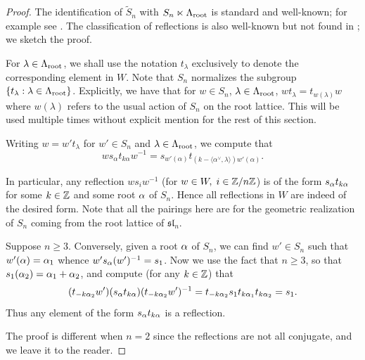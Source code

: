 \begin{proof}[Proof] 
The identification of $\tilde{S}_n$ with $S_n\ltimes\Lambda_{\operatorname{root}}$ is standard and well-known; for example see  \cite[Chapter 4]{HumphreysCoxeter}. The classification of reflections is also well-known but not found in \cite{HumphreysCoxeter}; we sketch the proof.

For $\lambda \in \Lambda_{\operatorname{root}}$, we shall use the notation $t_{\lambda}$ exclusively  to denote the corresponding element in $W$. Note that $S_n$ normalizes the subgroup $\{t_{\lambda}: \lambda \in \Lambda_{\operatorname{root}}\}$. 
Explicitly, we have that for $w\in S_n$, $\lambda \in \Lambda_{\operatorname{root}}$, $wt_{\lambda}=t_{w(\lambda)}w$ where $w(\lambda)$ refers to the usual action of $S_n$ on the root lattice. 
This will be used multiple times without explicit mention for the rest of this section.
    
Writing $w=w't_{\lambda}$ for $w' \in S_n$ and $\lambda \in \Lambda_{\operatorname{root}}$, we compute that
       \begin{equation}
            ws_{\alpha}t_{k\alpha}w^{-1} = s_{w'(\alpha)}t_{(k-\langle \alpha^\vee, \lambda \rangle)w'(\alpha)}.
        \end{equation}

 In particular, any reflection $ws_iw^{-1}$ (for $w\in W,\; i \in \mathbb{Z}/n\mathbb{Z}$) is of the form $s_{\alpha}t_{k\alpha}$ for some $k \in \mathbb{Z}$ and some root $\alpha$ of $S_n$.
 Hence all reflections in $W$ are indeed of the desired form.
 Note that all the pairings here are for the geometric realization of $S_n$ coming from the root lattice of $\mathfrak{sl}_n$.  


Suppose $n \ge 3$. Conversely, given a root $\alpha$ of $S_n$, we can find $w' \in S_n$ such that $w'(\alpha) = \alpha_1$ whence $w' s_{\alpha} (w')^{-1} = s_1$. Now we use the fact that $n \ge 3$, so that $s_1(\alpha_2) = \alpha_1 + \alpha_2$, and compute (for any $k \in \mathbb{Z}$) that
\begin{equation}  (t_{-k \alpha_2} w')(s_{\alpha} t_{k \alpha}) (t_{-k \alpha_2} w')^{-1} = t_{-k\alpha_2}s_1t_{k\alpha_1}t_{k\alpha_2} = s_1. \end{equation}
Thus any element of the form $s_{\alpha} t_{k \alpha}$ is a reflection.

The proof is different when $n=2$ since the reflections are not all conjugate, and we leave it to the reader. \end{proof}

